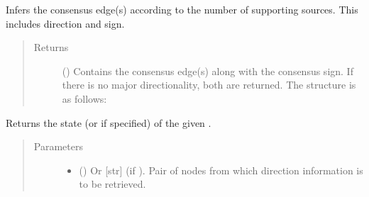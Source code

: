 \documentclass[letterpaper,10pt,english]{sphinxmanual}
\begin{document}
\begin{fulllineitems}
\begin{fulllineitems}
\begin{quote}
\begin{description}
\begin{description}
\end{description}


\end{description}\end{quote}

\end{fulllineitems}


\begin{fulllineitems}
\label{\detokenize{main:pypath.main.Direction.consensus_edges}}
Infers the consensus edge(s) according to the number of
supporting sources. This includes direction and sign.
\begin{quote}\begin{description}
\item[{Returns}] \leavevmode
() \textendash{} Contains the consensus edge(s) along with the
consensus sign. If there is no major directionality, both
are returned. The structure is as follows:

\end{description}\end{quote}

\end{fulllineitems}


\begin{fulllineitems}
\label{\detokenize{main:pypath.main.Direction.get_dir}}
Returns the state (or  if specified) of the given
.
\begin{quote}\begin{description}
\item[{Parameters}] \leavevmode\begin{itemize}
\item {} 
 () \textendash{} Or {[}str{]} (if ). Pair of nodes from which
direction information is to be retrieved.


\end{itemize}
\end{description}
\end{quote}
\end{fulllineitems}
\end{fulllineitems}
\end{document}
